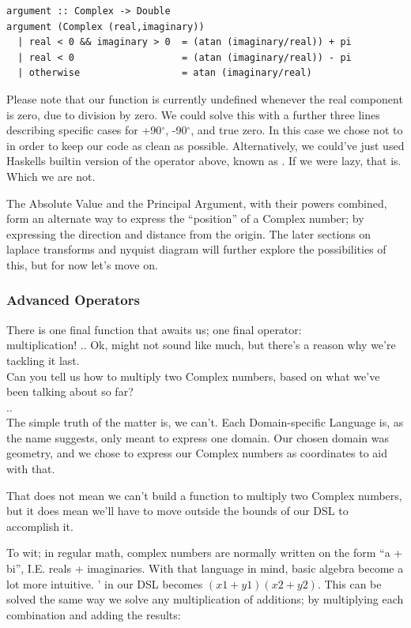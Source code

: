 \begin{verbatim}
argument :: Complex -> Double
argument (Complex (real,imaginary))
  | real < 0 && imaginary > 0  = (atan (imaginary/real)) + pi
  | real < 0                   = (atan (imaginary/real)) - pi
  | otherwise                  = atan (imaginary/real)
\end{verbatim}

Please note that our function is currently undefined whenever the real component is zero, due to division by zero. We could solve this with a further three lines describing specific cases for +90$^{\circ}$, -90$^{\circ}$, and true zero. In this case we chose not to in order to keep our code as clean as possible. Alternatively, we could've just used Haskells builtin version of the operator above, known as . If we were lazy, that is. Which we are not.
\vspace{5mm}

The Absolute Value and the Principal Argument, with their powers combined, form an alternate way to express the ``position'' of a Complex number; by expressing the direction and distance from the origin. The later sections on laplace transforms and nyquist diagram will further explore the possibilities of this, but for now let's move on.

\subsubsection{Advanced Operators}

There is one final function that awaits us; one final operator:\\ multiplication!
..
Ok, might not sound like much, but there's a reason why we're tackling it last.\\
Can you tell us how to multiply two Complex numbers, based on what we've been talking about so far?\\
..\\
The simple truth of the matter is, we can't. Each Domain-specific Language is, as the name suggests, only meant to express one domain. Our chosen domain was geometry, and we chose to express our Complex numbers as coordinates to aid with that.

That does not mean we can't build a function to multiply two Complex numbers, but it does mean we'll have to move outside the bounds of our DSL to accomplish it.

To wit; in regular math, complex numbers are normally written on the form ``a + bi'', I.E. reals + imaginaries. With that language in mind, basic algebra become a lot more intuitive. ' in our DSL becomes $(x1 + y1)(x2 + y2)$. This can be solved the same way we solve any multiplication of additions; by multiplying each combination and adding the results:

